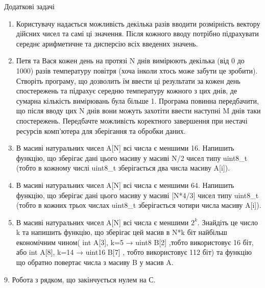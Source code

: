 \documentclass[]{article}
\makeatletter
\newcommand{\xslalph}[1]{\expandafter\@xslalph\csname c@#1\endcsname}
\newcommand{\@xslalph}[1]{%
    \ifcase#1\or а\or б\or в\or г\or д\or e\or є\or ж\or з\or i%
    \or й\or к\or л\or м\or н\or о\or п\or р\or с\or т%
    \or у\or ф\or х\or ц\or ч\or ш\or ю\or я\or аа\or бб\or вв%
    \else\@ctrerr\fi%
}
\makeatother
\begin{document}
\begin{enumerate}
\begin{enumerate}[label=\xslalph*)]
\begin{enumerate}
\begin{enumerate}[label=\xslalph*)]
\begin{enumerate}
\begin{enumerate}[label=\xslalph*)]
\end{enumerate}
\end{enumerate}

Додаткові задачі

\begin{enumerate}
\def\labelenumi{\arabic{enumi})}
\setcounter{enumi}{7}
\item
  Користувачу надається можливість декілька разів вводити розмірність
  вектору дійсних чисел та самі ці значення. Після кожного вводу
  потрібно підрахувати середнє арифметичне та дисперсію всіх введених
  значень.
\item
  Петя та Вася кожен день на протязі N днів вимірюють
  декілька (від 0 до 1000) разів температуру повітря (хоча інколи хтось
  може забути це зробити). Створіть програму, що дозволить їм ввести ці
  результати за кожен день спостережень та підрахує середню температуру
  кожного з цих днів, де сумарна кількість вимірювань була більше 1.
  Програма повинна передбачити, що після вводу цих N днів вони можуть
  захотіти ввести наступні M днів таки спостережень. Передбачте
  можливість коректного завершення при нестачі ресурсів комп'ютера для
  зберігання та обробки даних.
\item
 В масиві натуральних чисел A{[}N{]} всі числа є меншими 16. Напишить
  функцію, що зберігає дані цього масиву у масиві N/2 чисел типу
  uint8\_t (тобто в кожному числі uint8\_t зберігається два числа масиву
  A{[}i{]}).
\item
  В масиві натуральних чисел A{[}N{]} всі числа є меншими 64. Напишить
  функцію, що зберігає дані цього масиву у масиві {[}N*4/3{]} чисел типу
  uint8\_t (тобто в кожних трьох числах uint8\_t зберігається чотири
  числа масиву A{[}i{]}).
\item
  В масиві натуральних чисел A{[}N{]} всі числа є меншими \(2^{k}\).
  Знайдіть це число k та напишить функцію, що зберігає цей масив в N*k
  біт найбільш економічним чином( int A{[}3{]}, k=5 → uint8 B{[}2{]}
  ,тобто використовує 16 біт, або int A{[}8{]}, k=14 → uint16 B{[}7{]} ,
  тобто використовує 112 біт) та функцію що обратно повертає числа з
  масиву B у масив A.
\end{enumerate}


9. Робота з рядком, що закінчується нулем на С.


\end{enumerate}
\end{enumerate}
\end{enumerate}
\end{enumerate}
\end{document}
